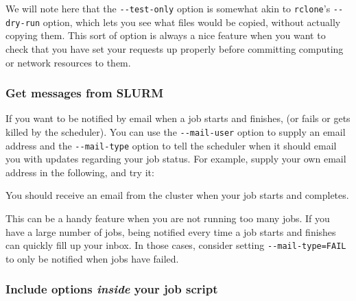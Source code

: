 \documentclass[]{krantz}
\makeatletter
\newenvironment{Shaded}{\begin{snugshade}}{\end{snugshade}}
\newcommand{\ExtensionTok}[1]{#1}
\newcommand{\NormalTok}[1]{#1}
\newenvironment{kframe}{%
\medskip{}
\setlength{\fboxsep}{.8em}
 \def\at@end@of@kframe{}%
 \ifinner\ifhmode%
  \def\at@end@of@kframe{\end{minipage}}%
  \begin{minipage}{\columnwidth}%
 \fi\fi%
 \def\FrameCommand##1{\hskip\@totalleftmargin \hskip-\fboxsep
 \colorbox{shadecolor}{##1}\hskip-\fboxsep
     \hskip-\linewidth \hskip-\@totalleftmargin \hskip\columnwidth}%
 \MakeFramed {\advance\hsize-\width
   \@totalleftmargin\z@ \linewidth\hsize
   \@setminipage}}%
 {\par\unskip\endMakeFramed%
 \at@end@of@kframe}
\renewenvironment{Shaded}{\begin{kframe}}{\end{kframe}}
\makeatother
\begin{document}
We will note here that the \texttt{-\/-test-only} option is somewhat akin to \texttt{rclone}'s \texttt{-\/-dry-run}
option, which lets you see what files would be copied, without actually copying them. This
sort of option is always a nice feature when you want to check that you have set your requests
up properly before committing computing or network resources to them.

\hypertarget{get-messages-from-slurm}{%
\subsubsection{Get messages from SLURM}\label{get-messages-from-slurm}}

If you want to be notified by email when a job starts and finishes, (or fails
or gets killed by the scheduler). You can use the \texttt{-\/-mail-user} option to supply
an email address and the \texttt{-\/-mail-type} option to tell the scheduler when it should
email you with updates regarding your job status. For example, supply your own
email address in the following, and try it:

\begin{Shaded}
\end{Shaded}

You should receive an email from the cluster when your job starts and completes.

This can be a handy feature when you are not running too many jobs. If you have a large number
of jobs, being notified
every time a job starts and finishes can quickly fill up your inbox. In those cases, consider
setting \texttt{-\/-mail-type=FAIL} to only be notified when jobs have failed.

\hypertarget{include-options-inside-your-job-script}{%
\subsubsection{\texorpdfstring{Include options \emph{inside} your job script}{Include options inside your job script}}\label{include-options-inside-your-job-script}}
\end{document}
